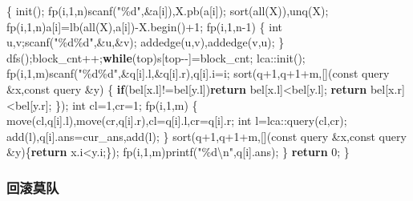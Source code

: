 \documentclass[
]{article}
\newenvironment{Shaded}{}{}
\newcommand{\AttributeTok}[1]{\textcolor[rgb]{0.49,0.56,0.16}{#1}}
\newcommand{\ControlFlowTok}[1]{\textcolor[rgb]{0.00,0.44,0.13}{\textbf{#1}}}
\newcommand{\DataTypeTok}[1]{\textcolor[rgb]{0.56,0.13,0.00}{#1}}
\newcommand{\DecValTok}[1]{\textcolor[rgb]{0.25,0.63,0.44}{#1}}
\newcommand{\NormalTok}[1]{#1}
\newcommand{\SpecialCharTok}[1]{\textcolor[rgb]{0.25,0.44,0.63}{#1}}
\newcommand{\StringTok}[1]{\textcolor[rgb]{0.25,0.44,0.63}{#1}}
\begin{document}
\begin{Shaded}
\begin{Highlighting}[]
\NormalTok{    \{}
\NormalTok{        init();}
\NormalTok{        fp(i,}\DecValTok{1}\NormalTok{,n)scanf(}\StringTok{"}\SpecialCharTok{\%d}\StringTok{"}\NormalTok{,\&a[i]),X.pb(a[i]);}
\NormalTok{        sort(all(X)),unq(X);}
\NormalTok{        fp(i,}\DecValTok{1}\NormalTok{,n)a[i]=lb(all(X),a[i]){-}X.begin()+}\DecValTok{1}\NormalTok{;}
\NormalTok{        fp(i,}\DecValTok{1}\NormalTok{,n{-}}\DecValTok{1}\NormalTok{)}
\NormalTok{        \{}
            \DataTypeTok{int}\NormalTok{ u,v;scanf(}\StringTok{"}\SpecialCharTok{\%d\%d}\StringTok{"}\NormalTok{,\&u,\&v);}
\NormalTok{            addedge(u,v),addedge(v,u);}
\NormalTok{        \}}
\NormalTok{        dfs();block\_cnt++;}\ControlFlowTok{while}\NormalTok{(top)s[top{-}{-}]=block\_cnt;}
\NormalTok{        lca::init();}
\NormalTok{        fp(i,}\DecValTok{1}\NormalTok{,m)scanf(}\StringTok{"}\SpecialCharTok{\%d\%d}\StringTok{"}\NormalTok{,\&q[i].l,\&q[i].r),q[i].i=i;}
\NormalTok{        sort(q+}\DecValTok{1}\NormalTok{,q+}\DecValTok{1}\NormalTok{+m,[](}\AttributeTok{const}\NormalTok{ query \&x,}\AttributeTok{const}\NormalTok{ query \&y)}
\NormalTok{        \{}
            \ControlFlowTok{if}\NormalTok{(bel[x.l]!=bel[y.l])}\ControlFlowTok{return}\NormalTok{ bel[x.l]\textless{}bel[y.l];}
            \ControlFlowTok{return}\NormalTok{ bel[x.r]\textless{}bel[y.r];}
\NormalTok{        \});}
        \DataTypeTok{int}\NormalTok{ cl=}\DecValTok{1}\NormalTok{,cr=}\DecValTok{1}\NormalTok{;}
\NormalTok{        fp(i,}\DecValTok{1}\NormalTok{,m)}
\NormalTok{        \{}
\NormalTok{            move(cl,q[i].l),move(cr,q[i].r),cl=q[i].l,cr=q[i].r;}
            \DataTypeTok{int}\NormalTok{ l=lca::query(cl,cr); add(l),q[i].ans=cur\_ans,add(l);}
\NormalTok{        \}}
\NormalTok{        sort(q+}\DecValTok{1}\NormalTok{,q+}\DecValTok{1}\NormalTok{+m,[](}\AttributeTok{const}\NormalTok{ query \&x,}\AttributeTok{const}\NormalTok{ query \&y)\{}\ControlFlowTok{return}\NormalTok{ x.i\textless{}y.i;\});}
\NormalTok{        fp(i,}\DecValTok{1}\NormalTok{,m)printf(}\StringTok{"}\SpecialCharTok{\%d\textbackslash{}n}\StringTok{"}\NormalTok{,q[i].ans);}
\NormalTok{    \}}
    \ControlFlowTok{return} \DecValTok{0}\NormalTok{;}
\NormalTok{\}}
\end{Highlighting}
\end{Shaded}

\hypertarget{ux56deux6edaux83abux961f}{%
\subsubsection{回滚莫队}\label{ux56deux6edaux83abux961f}}
\end{document}
